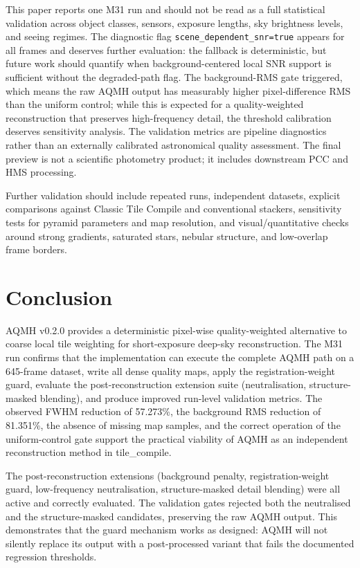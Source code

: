 \documentclass[10pt,twocolumn]{article}
\begin{document}
This paper reports one M31 run and should not be read as a full statistical validation across
object classes, sensors, exposure lengths, sky brightness levels, and seeing regimes. The
diagnostic flag \texttt{scene\_dependent\_snr=true} appears for all frames and deserves further
evaluation: the fallback is deterministic, but future work should quantify when
background-centered local SNR support is sufficient without the degraded-path flag. The
background-RMS gate triggered, which means the raw AQMH output has measurably higher
pixel-difference RMS than the uniform control; while this is expected for a quality-weighted
reconstruction that preserves high-frequency detail, the threshold calibration deserves
sensitivity analysis. The validation metrics are pipeline diagnostics rather than an externally
calibrated astronomical quality assessment. The final preview is not a scientific photometry
product; it includes downstream PCC and HMS processing.

Further validation should include repeated runs, independent datasets, explicit comparisons
against Classic Tile Compile and conventional stackers, sensitivity tests for pyramid parameters
and map resolution, and visual/quantitative checks around strong gradients, saturated stars,
nebular structure, and low-overlap frame borders.

\section{Conclusion}

AQMH v0.2.0 provides a deterministic pixel-wise quality-weighted alternative to coarse local tile
weighting for short-exposure deep-sky reconstruction. The M31 run confirms that the implementation
can execute the complete AQMH path on a 645-frame dataset, write all dense quality maps, apply the
registration-weight guard, evaluate the post-reconstruction extension suite (neutralisation,
structure-masked blending), and produce improved run-level validation metrics. The observed FWHM
reduction of \num{57.273}\%, the background RMS reduction of \num{81.351}\%, the absence of
missing map samples, and the correct operation of the uniform-control gate support the practical
viability of AQMH as an independent reconstruction method in tile\_compile.

The post-reconstruction extensions (background penalty, registration-weight guard, low-frequency
neutralisation, structure-masked detail blending) were all active and correctly evaluated. The
validation gates rejected both the neutralised and the structure-masked candidates, preserving
the raw AQMH output. This demonstrates that the guard mechanism works as designed: AQMH will not
silently replace its output with a post-processed variant that fails the documented regression
thresholds.
\end{document}
